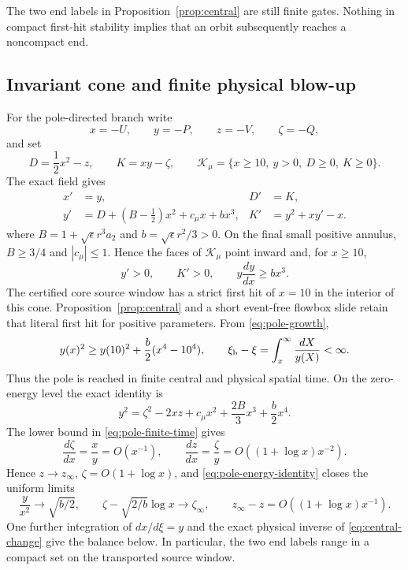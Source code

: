\documentclass[11pt,reqno]{amsart}
\numberwithin{equation}{section}
\theoremstyle{definition}
\theoremstyle{remark}
\begin{document}
The two end labels in Proposition~\ref{prop:central} are still finite gates.
Nothing in compact first-hit stability implies that an orbit subsequently
reaches a noncompact end.

\subsection{Invariant cone and finite physical blow-up}

For the pole-directed branch write
\begin{equation}\label{eq:pole-central-vars}
 x=-U,\qquad y=-P,\qquad z=-V,\qquad \zeta=-Q,
\end{equation}
and set
\begin{equation}\label{eq:pole-cone}
 D=\frac12x^2-z,\qquad K=xy-\zeta,\qquad
 \mathcal K_\mu=\{x\ge10,\ y>0,\ D\ge0,\ K\ge0\}.
\end{equation}
The exact field gives
\begin{equation}\label{eq:pole-cone-identities}
 \begin{aligned}
  x'&=y,& D'&=K,\\
  y'&=D+(B-\tfrac12)x^2+c_\mu x+bx^3,&
  K'&=y^2+xy'-x.
 \end{aligned}
\end{equation}
where $B=1+\sqrt\epsilon r^3a_2$ and
$b=\sqrt\epsilon r^2/3>0$.  On the final small positive annulus,
$B\ge3/4$ and $|c_\mu|\le1$.  Hence the faces of
$\mathcal K_\mu$ point inward and, for $x\ge10$,
\begin{equation}\label{eq:pole-growth}
 y'>0,\qquad K'>0,\qquad
 y\frac{dy}{dx}\ge bx^3.
\end{equation}
The certified core source window has a strict first hit of $x=10$ in the
interior of this cone.  Proposition~\ref{prop:central} and a short event-free
flowbox slide retain that literal first hit for positive parameters.  From
\eqref{eq:pole-growth},
\begin{equation}\label{eq:pole-finite-time}
 y(x)^2\ge y(10)^2+\frac b2(x^4-10^4),\qquad
 \xi_{\rm b}-\xi=\int_x^\infty\frac{dX}{y(X)}<\infty.
\end{equation}
Thus the pole is reached in finite central and physical spatial time.
On the zero-energy level the exact identity is
\begin{equation}\label{eq:pole-energy-identity}
 y^2=\zeta^2-2xz+c_\mu x^2+\frac{2B}{3}x^3+\frac b2x^4.
\end{equation}
The lower bound in \eqref{eq:pole-finite-time} gives
\[
 \frac{d\zeta}{dx}=\frac{x}{y}=O(x^{-1}),\qquad
 \frac{dz}{dx}=\frac{\zeta}{y}=O((1+\log x)x^{-2}).
\]
Hence $z\to z_\infty$, $\zeta=O(1+\log x)$, and
\eqref{eq:pole-energy-identity} closes the uniform limits
\begin{equation}\label{eq:pole-central-sharp}
 \frac{y}{x^2}\to\sqrt{b/2},\qquad
 \zeta-\sqrt{2/b}\log x\to\zeta_\infty,\qquad
 z_\infty-z=O((1+\log x)x^{-1}).
\end{equation}
One further integration of $dx/d\xi=y$ and the exact physical inverse of
\eqref{eq:central-change} give the balance below.  In particular, the two
end labels range in a compact set on the transported source window.
\end{document}
